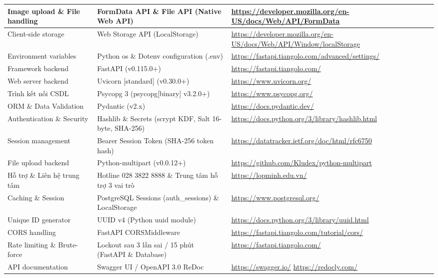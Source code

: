 \documentclass[12pt,a4paper]{report}
\begin{document}
\begin{longtable}{|>{\raggedright\arraybackslash}p{3.8cm}|>{\raggedright\arraybackslash}p{5.4cm}|>{\raggedright\arraybackslash}p{6.4cm}|}
    Image upload \& File handling & FormData API \& File API (Native Web API) & \url{https://developer.mozilla.org/en-US/docs/Web/API/FormData} \\ \hline
    Client-side storage & Web Storage API (LocalStorage) & \url{https://developer.mozilla.org/en-US/docs/Web/API/Window/localStorage} \\ \hline
    Environment variables & Python os \& Dotenv configuration (.env) & \url{https://fastapi.tiangolo.com/advanced/settings/} \\ \hline
    Framework backend & FastAPI (v0.115.0+) & \url{https://fastapi.tiangolo.com/} \\ \hline
    Web server backend & Uvicorn [standard] (v0.30.0+) & \url{https://www.uvicorn.org/} \\ \hline
    Trình kết nối CSDL & Psycopg 3 (psycopg[binary] v3.2.0+) & \url{https://www.psycopg.org/} \\ \hline
    ORM \& Data Validation & Pydantic (v2.x) & \url{https://docs.pydantic.dev/} \\ \hline
    Authentication \& Security & Hashlib \& Secrets (scrypt KDF, Salt 16-byte, SHA-256) & \url{https://docs.python.org/3/library/hashlib.html} \\ \hline
    Session management & Bearer Session Token (SHA-256 token hash) & \url{https://datatracker.ietf.org/doc/html/rfc6750} \\ \hline
    File upload backend & Python-multipart (v0.0.12+) & \url{https://github.com/Kludex/python-multipart} \\ \hline
    Hỗ trợ \& Liên hệ trung tâm & Hotline 028 3822 8888 \& Trung tâm hỗ trợ 3 vai trò & \url{https://lopminh.edu.vn/} \\ \hline
    Caching \& Session & PostgreSQL Sessions (auth\_sessions) \& LocalStorage & \url{https://www.postgresql.org/} \\ \hline
    Unique ID generator & UUID v4 (Python uuid module) & \url{https://docs.python.org/3/library/uuid.html} \\ \hline
    CORS handling & FastAPI CORSMiddleware & \url{https://fastapi.tiangolo.com/tutorial/cors/} \\ \hline
    Rate limiting \& Brute-force & Lockout sau 3 lần sai / 15 phút (FastAPI \& Database) & \url{https://fastapi.tiangolo.com/} \\ \hline
    API documentation & Swagger UI / OpenAPI 3.0 \newline ReDoc & \url{https://swagger.io/} \newline \url{https://redocly.com/} \\ \hline

\end{longtable}
\end{document}
